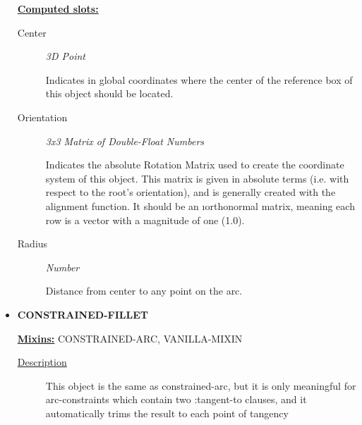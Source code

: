 \documentclass [11pt]{book}
\begin{document}
\begin{itemize}
\textbf{
\underline{Computed slots:}}

\begin{description}

\item [Center]
\emph{3D Point}

 Indicates in global coordinates where the center of the reference
box of this object should be located.




\item [Orientation]
\emph{3x3 Matrix of Double-Float Numbers}

 Indicates the absolute Rotation Matrix used to create
the coordinate system of this object. This matrix is given in absolute terms (i.e. with
respect to the root's orientation), and is generally created with the alignment function.
It should be an 
\i{orthonormal} matrix, meaning each row is a vector with a magnitude
of one (1.0).




\item [Radius]
\emph{Number}

 Distance from center to any point on the arc.




\end{description}







\item {}
\label{prim:constrained-fillet}
\textbf{CONSTRAINED-FILLET}


\textbf{
\underline{Mixins:}} CONSTRAINED-ARC, VANILLA-MIXIN





\begin{description}

\item [
\underline{Description}]


This object is the same as constrained-arc, but it is only
meaningful for arc-constraints which contain two :tangent-to clauses,
and it automatically trims the result to each point of tangency



\end{description}









\end{itemize}
\end{document}
